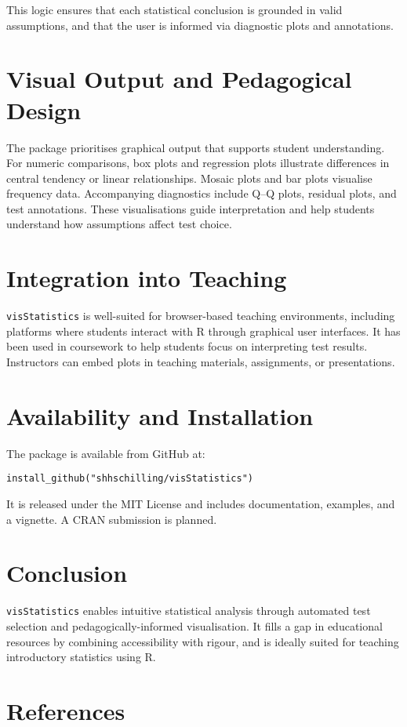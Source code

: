 \documentclass[11pt]{article}
\begin{document}
This logic ensures that each statistical conclusion is grounded in valid assumptions, and that the
user is informed via diagnostic plots and annotations.

\section{Visual Output and Pedagogical Design}

The package prioritises graphical output that supports student understanding.
For numeric comparisons, box plots and regression plots illustrate differences in central
tendency or linear relationships. Mosaic plots and bar plots visualise frequency data.
Accompanying diagnostics include Q–Q plots, residual plots, and test annotations.
These visualisations guide interpretation and help students understand how
assumptions affect test choice.

\section{Integration into Teaching}

\texttt{visStatistics} is well-suited for browser-based teaching environments, including platforms
where students interact with R through graphical user interfaces. It has been used in coursework
to help students focus on interpreting test results. Instructors can embed plots in teaching
materials, assignments, or presentations.

\section{Availability and Installation}

The package is available from GitHub at:
\begin{verbatim}
install_github("shhschilling/visStatistics")
\end{verbatim}

It is released under the MIT License and includes documentation, examples, and a vignette.
A CRAN submission is planned.

\section{Conclusion}

\texttt{visStatistics} enables intuitive statistical analysis through automated test
selection and pedagogically-informed visualisation. It fills a gap in educational
resources by combining accessibility with rigour, and is ideally suited for teaching
introductory statistics using R.

\section*{References}


\end{document}
